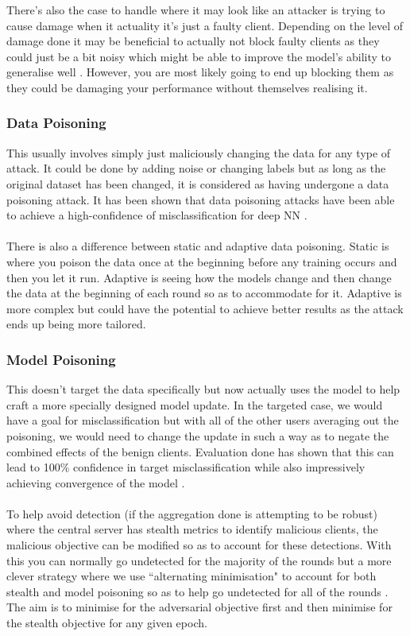 There's also the case to handle where it may look like an attacker is trying to cause damage when it actuality it's just a faulty client. Depending on the level of damage done it may be beneficial to actually not block faulty clients as they could just be a bit noisy which might be able to improve the model's ability to generalise well \cite{dnn_noise, robust_corrupt_noise}. However, you are most likely going to end up blocking them as they could be damaging your performance without themselves realising it.

\subsubsection{Data Poisoning}
This usually involves simply just maliciously changing the data for any type of attack. It could be done by adding noise or changing labels but as long as the original dataset has been changed, it is considered as having undergone a data poisoning attack. It has been shown that data poisoning attacks have been able to achieve a high-confidence of misclassification for deep NN \cite{poison_dnn}. \\ \\
There is also a difference between static and adaptive data poisoning. Static is where you poison the data once at the beginning before any training occurs and then you let it run. Adaptive is seeing how the models change and then change the data at the beginning of each round so as to accommodate for it. Adaptive is more complex but could have the potential to achieve better results as the attack ends up being more tailored.

\subsubsection{Model Poisoning}
This doesn't target the data specifically but now actually uses the model to help craft a more specially designed model update. 
In the targeted case, we would have a goal for misclassification but with all of the other users averaging out the poisoning, we would need to change the update in such a way as to negate the combined effects of the benign clients.
Evaluation done has shown that this can lead to 100\% confidence in target misclassification while also impressively achieving convergence of the model \cite{adversarial_lens}. 
\\ \\
To help avoid detection (if the aggregation done is attempting to be robust) where the central server has stealth metrics to identify malicious clients, the malicious objective can be modified so as to account for these detections. 
With this you can normally go undetected for the majority of the rounds but a more clever strategy where we use ``alternating minimisation" to account for both stealth and model poisoning so as to help go undetected for all of the rounds \cite{adversarial_lens}. 
The aim is to minimise for the adversarial objective first and then minimise for the stealth objective for any given epoch.

